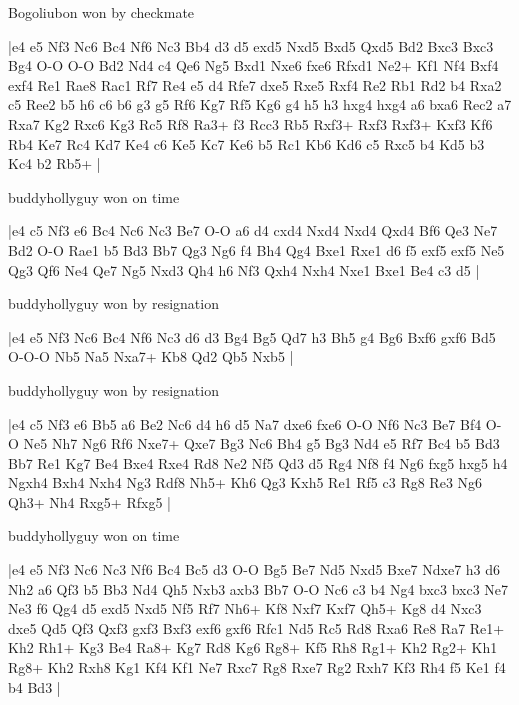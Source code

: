 \showboard

Bogoliubon won by checkmate

\makegametitle
|e4 e5 Nf3 Nc6 Bc4 Nf6 Nc3 Bb4 d3 d5 exd5 Nxd5 Bxd5 Qxd5 Bd2 Bxc3 Bxc3 Bg4 O-O O-O Bd2 Nd4 c4 Qe6 Ng5 Bxd1 Nxe6 fxe6 Rfxd1 Ne2+ Kf1 Nf4 Bxf4 exf4 Re1 Rae8 Rac1 Rf7 Re4 e5 d4 Rfe7 dxe5 Rxe5 Rxf4 Re2 Rb1 Rd2 b4 Rxa2 c5 Ree2 b5 h6 c6 b6 g3 g5 Rf6 Kg7 Rf5 Kg6 g4 h5 h3 hxg4 hxg4 a6 bxa6 Rec2 a7 Rxa7 Kg2 Rxc6 Kg3 Rc5 Rf8 Ra3+ f3 Rcc3 Rb5 Rxf3+ Rxf3 Rxf3+ Kxf3 Kf6 Rb4 Ke7 Rc4 Kd7 Ke4 c6 Ke5 Kc7 Ke6 b5 Rc1 Kb6 Kd6 c5 Rxc5 b4 Kd5 b3 Kc4 b2 Rb5+  |

\showboard

buddyhollyguy won on time

\makegametitle
|e4 c5 Nf3 e6 Bc4 Nc6 Nc3 Be7 O-O a6 d4 cxd4 Nxd4 Nxd4 Qxd4 Bf6 Qe3 Ne7 Bd2 O-O Rae1 b5 Bd3 Bb7 Qg3 Ng6 f4 Bh4 Qg4 Bxe1 Rxe1 d6 f5 exf5 exf5 Ne5 Qg3 Qf6 Ne4 Qe7 Ng5 Nxd3 Qh4 h6 Nf3 Qxh4 Nxh4 Nxe1 Bxe1 Be4 c3 d5  |

\showboard

buddyhollyguy won by resignation

\makegametitle
|e4 e5 Nf3 Nc6 Bc4 Nf6 Nc3 d6 d3 Bg4 Bg5 Qd7 h3 Bh5 g4 Bg6 Bxf6 gxf6 Bd5 O-O-O Nb5 Na5 Nxa7+ Kb8 Qd2 Qb5 Nxb5  |

\showboard

buddyhollyguy won by resignation

\makegametitle
|e4 c5 Nf3 e6 Bb5 a6 Be2 Nc6 d4 h6 d5 Na7 dxe6 fxe6 O-O Nf6 Nc3 Be7 Bf4 O-O Ne5 Nh7 Ng6 Rf6 Nxe7+ Qxe7 Bg3 Nc6 Bh4 g5 Bg3 Nd4 e5 Rf7 Bc4 b5 Bd3 Bb7 Re1 Kg7 Be4 Bxe4 Rxe4 Rd8 Ne2 Nf5 Qd3 d5 Rg4 Nf8 f4 Ng6 fxg5 hxg5 h4 Ngxh4 Bxh4 Nxh4 Ng3 Rdf8 Nh5+ Kh6 Qg3 Kxh5 Re1 Rf5 c3 Rg8 Re3 Ng6 Qh3+ Nh4 Rxg5+ Rfxg5  |

\showboard

buddyhollyguy won on time

\makegametitle
|e4 e5 Nf3 Nc6 Nc3 Nf6 Bc4 Bc5 d3 O-O Bg5 Be7 Nd5 Nxd5 Bxe7 Ndxe7 h3 d6 Nh2 a6 Qf3 b5 Bb3 Nd4 Qh5 Nxb3 axb3 Bb7 O-O Nc6 c3 b4 Ng4 bxc3 bxc3 Ne7 Ne3 f6 Qg4 d5 exd5 Nxd5 Nf5 Rf7 Nh6+ Kf8 Nxf7 Kxf7 Qh5+ Kg8 d4 Nxc3 dxe5 Qd5 Qf3 Qxf3 gxf3 Bxf3 exf6 gxf6 Rfc1 Nd5 Rc5 Rd8 Rxa6 Re8 Ra7 Re1+ Kh2 Rh1+ Kg3 Be4 Ra8+ Kg7 Rd8 Kg6 Rg8+ Kf5 Rh8 Rg1+ Kh2 Rg2+ Kh1 Rg8+ Kh2 Rxh8 Kg1 Kf4 Kf1 Ne7 Rxc7 Rg8 Rxe7 Rg2 Rxh7 Kf3 Rh4 f5 Ke1 f4 b4 Bd3  |

